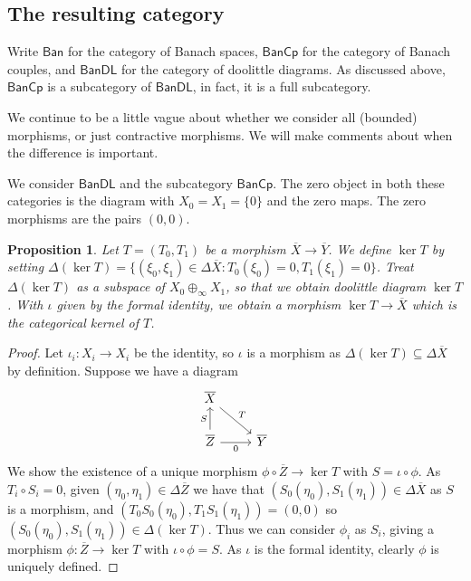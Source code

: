 \documentclass[a4paper,11pt]{article}
\theoremstyle{plain}
\newtheorem{proposition}{Proposition}[section]
\theoremstyle{remark}
\newcommand{\msf}[1]{\mathsf{#1}}
\begin{document}
\subsection{The resulting category}

Write $\msf{Ban}$ for the category of Banach spaces, $\msf{BanCp}$ for the category of Banach couples, and $\msf{BanDL}$ for the category of doolittle diagrams.  As discussed above, $\msf{BanCp}$ is a subcategory of $\msf{BanDL}$, in fact, it is a full subcategory.

We continue to be a little vague about whether we consider all (bounded) morphisms, or just contractive morphisms.  We will make comments about when the difference is important.

We consider $\msf{BanDL}$ and the subcategory $\msf{BanCp}$.
The zero object in both these categories is the diagram with $X_0 = X_1 = \{0\}$ and the zero maps.  The zero morphisms are the pairs $(0,0)$.

\begin{proposition}
Let $T=(T_0,T_1)$ be a morphism $\overline X \to \overline Y$.  We define $\ker T$ by setting $\Delta(\ker T) = \{ (\xi_0,\xi_1)\in\Delta\overline X : T_0(\xi_0)=0, T_1(\xi_1)=0 \}$.
Treat $\Delta(\ker T)$ as a subspace of $X_0\oplus_\infty X_1$, so that we obtain doolittle diagram $\ker T$.  With $\iota$ given by the formal identity, we obtain a morphism $\ker T \to \overline X$ which is the categorical kernel of $T$.
\end{proposition}
\begin{proof}
Let $\iota_i \colon X_i\to X_i$ be the identity, so $\iota$ is a morphism as $\Delta(\ker T) \subseteq \Delta\overline X$ by definition.
Suppose we have a diagram
\[ \begin{tikzcd}
  \overline X \arrow[rd, "T"] \\
  \overline Z \arrow[u, "S"] \arrow[r, "0"'] & \overline Y
\end{tikzcd} \]
We show the existence of a unique morphism $\phi\circ \overline Z \to \ker T$ with $S = \iota\circ \phi$.  As $T_i\circ S_i = 0$, given $(\eta_0,\eta_1) \in \Delta\overline Z$ we have that $(S_0(\eta_0), S_1(\eta_1)) \in \Delta\overline X$ as $S$ is a morphism, and $(T_0S_0(\eta_0), T_1S_1(\eta_1))= (0,0)$ so $(S_0(\eta_0), S_1(\eta_1)) \in \Delta(\ker T)$.  Thus we can consider $\phi_i$ as $S_i$, giving a morphism $\phi\colon\overline Z \to \ker T$ with $\iota\circ\phi=S$.  As $\iota$ is the formal identity, clearly $\phi$ is uniquely defined.
\end{proof}
\end{document}
